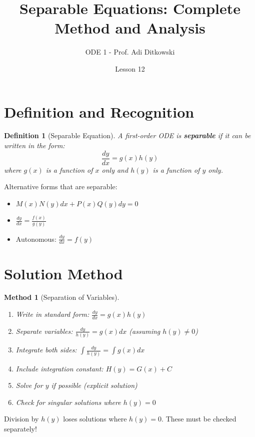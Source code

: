 \documentclass[12pt]{article}
\title{Separable Equations: Complete Method and Analysis}
\author{ODE 1 - Prof. Adi Ditkowski}
\date{Lesson 12}
\newtheorem{definition}{Definition}
\newtheorem{method}{Method}
\begin{document}
\maketitle

\section{Definition and Recognition}

\begin{definition}[Separable Equation]
A first-order ODE is \textbf{separable} if it can be written in the form:
$$\frac{dy}{dx} = g(x)h(y)$$
where $g(x)$ is a function of $x$ only and $h(y)$ is a function of $y$ only.
\end{definition}

\begin{keypoint}
Alternative forms that are separable:
\begin{itemize}
    \item $M(x)N(y)dx + P(x)Q(y)dy = 0$
    \item $\frac{dy}{dx} = \frac{f(x)}{g(y)}$
    \item Autonomous: $\frac{dy}{dx} = f(y)$
\end{itemize}
\end{keypoint}

\section{Solution Method}

\begin{method}[Separation of Variables]
\begin{enumerate}
    \item Write in standard form: $\frac{dy}{dx} = g(x)h(y)$
    \item Separate variables: $\frac{dy}{h(y)} = g(x)dx$ \quad (assuming $h(y) \neq 0$)
    \item Integrate both sides: $\int \frac{dy}{h(y)} = \int g(x)dx$
    \item Include integration constant: $H(y) = G(x) + C$
    \item Solve for $y$ if possible (explicit solution)
    \item Check for singular solutions where $h(y) = 0$
\end{enumerate}
\end{method}

\begin{warning}
Division by $h(y)$ loses solutions where $h(y) = 0$. These must be checked separately!
\end{warning}
\end{document}
